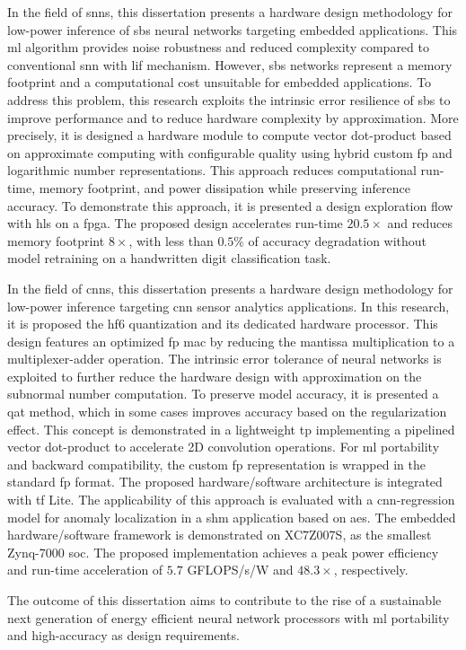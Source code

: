 In the field of \glspl{snn}, this dissertation presents a hardware design methodology for low-power inference of \gls{sbs} neural networks targeting embedded applications. This \gls{ml} algorithm provides noise robustness and reduced complexity compared to conventional \gls{snn} with \gls{lif} mechanism. However, \gls{sbs} networks represent a memory footprint and a computational cost unsuitable for embedded applications. To address this problem, this research exploits the intrinsic error resilience of \gls{sbs} to improve performance and to reduce hardware complexity by approximation. More precisely, it is designed a hardware module to compute vector dot-product based on approximate computing with configurable quality using hybrid custom \gls{fp} and logarithmic number representations. This approach reduces computational run-time, memory footprint, and power dissipation while preserving inference accuracy. To demonstrate this approach, it is presented a design exploration flow with \gls{hls} on a \gls{fpga}. The proposed design accelerates run-time $20.5\times$ and reduces memory footprint $8\times$, with less than $0.5\%$ of accuracy degradation without model retraining on a handwritten digit classification task.

In the field of \glspl{cnn}, this dissertation presents a hardware design methodology for low-power inference targeting \gls{cnn} sensor analytics applications. In this research, it is proposed the \gls{hf6} quantization and its dedicated hardware processor. This design features an optimized \gls{fp} \gls{mac} by reducing the mantissa multiplication to a multiplexer-adder operation. The intrinsic error tolerance of neural networks is exploited to further reduce the hardware design with approximation on the subnormal number computation. To preserve model accuracy, it is presented a \gls{qat} method, which in some cases improves accuracy based on the regularization effect. This concept is demonstrated in a lightweight \gls{tp} implementing a pipelined vector dot-product to accelerate 2D convolution operations. For \gls{ml} portability and backward compatibility, the custom \gls{fp} representation is wrapped in the standard \gls{fp} format. The proposed hardware/software architecture is integrated with \gls{tf} Lite. The applicability of this approach is evaluated with a \gls{cnn}-regression model for anomaly localization in a \gls{shm} application based on \glspl{ae}. The embedded hardware/software framework is demonstrated on XC7Z007S, as the smallest Zynq-7000 \gls{soc}. The proposed implementation achieves a peak power efficiency and run-time acceleration of $5.7$ GFLOPS/s/W and $48.3\times$, respectively.

The outcome of this dissertation aims to contribute to the rise of a sustainable next generation of energy efficient neural network processors with \gls{ml} portability and high-accuracy as design requirements.